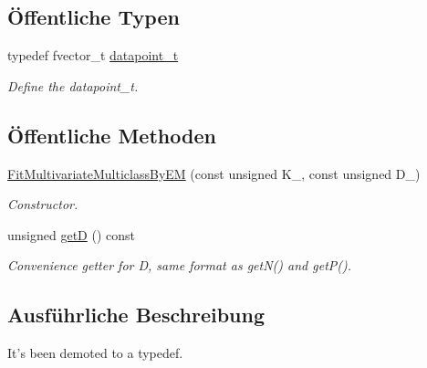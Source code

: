 \subsection*{Öffentliche Typen}
\begin{DoxyCompactItemize}
\item 
\hypertarget{classCDA_1_1FitMultivariateMulticlassByEM_a1da490e479036c62f0cbf55dd06201a6}{
typedef fvector\_\-t \hyperlink{classCDA_1_1FitMultivariateMulticlassByEM_a1da490e479036c62f0cbf55dd06201a6}{datapoint\_\-t}}
\label{classCDA_1_1FitMultivariateMulticlassByEM_a1da490e479036c62f0cbf55dd06201a6}

\begin{DoxyCompactList}\small\item\em Define the datapoint\_\-t. \item\end{DoxyCompactList}\end{DoxyCompactItemize}
\subsection*{Öffentliche Methoden}
\begin{DoxyCompactItemize}
\item 
\hyperlink{classCDA_1_1FitMultivariateMulticlassByEM_a8d6225a029e5e06f09e9820abe538286}{FitMultivariateMulticlassByEM} (const unsigned K\_\-, const unsigned D\_\-)
\begin{DoxyCompactList}\small\item\em Constructor. \item\end{DoxyCompactList}\item 
\hypertarget{classCDA_1_1FitMultivariateMulticlassByEM_a61354d086a158b075beccd1a956eb1f8}{
unsigned \hyperlink{classCDA_1_1FitMultivariateMulticlassByEM_a61354d086a158b075beccd1a956eb1f8}{getD} () const }
\label{classCDA_1_1FitMultivariateMulticlassByEM_a61354d086a158b075beccd1a956eb1f8}

\begin{DoxyCompactList}\small\item\em Convenience getter for D, same format as getN() and getP(). \item\end{DoxyCompactList}\end{DoxyCompactItemize}


\subsection{Ausführliche Beschreibung}
It's been demoted to a typedef. 

